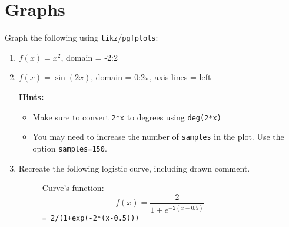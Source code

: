 \section{Graphs}
Graph the following using \texttt{tikz}/\texttt{pgfplots}:
\begin{enumerate}
\item \( f(x)=x^2 \), domain = -2:2
\item \( f(x) = \sin(2x)  \), domain = 0:2$\pi$, axis lines = left

\begin{figure}[h]\centering
{}
\end{figure}

\textbf{Hints:}
\begin{itemize}
    \item Make sure to convert \verb|2*x| to degrees using \verb|deg(2*x)|
    \item You may need to increase the number of \texttt{samples} in the plot. Use the option \texttt{samples=150}. 
\end{itemize}
\clearpage
\item Recreate the following logistic curve, including drawn comment.
\begin{figure}[h]
\centering
\begin{minipage}{0.35\textwidth} \centering
    Curve's function:
    \begin{equation*}
        f(x) = \frac{2}{1+e^{-2(x-0.5)}}    
    \end{equation*}
    \verb|= 2/(1+exp(-2*(x-0.5)))|
\end{minipage}
\begin{minipage}{0.60\textwidth}
\end{minipage}
\end{figure}


\end{enumerate}
